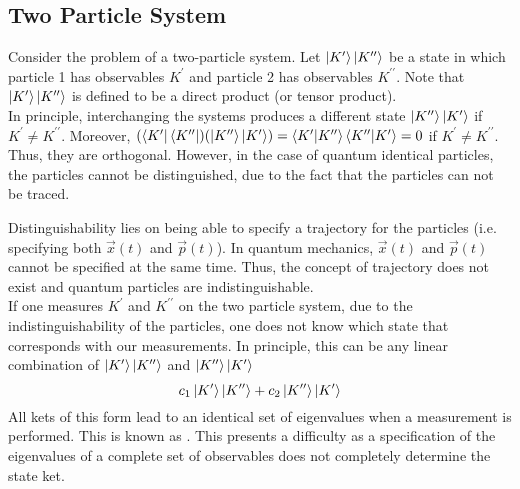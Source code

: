 \documentclass[12pt,a4paper,titlepage]{article}
\newcommand{\ul}[1]{\underline{\smash{#1}}} %
\begin{document}
\subsection{Two Particle System}
Consider the problem of a two-particle system. Let $\ket{K^{\prime}}\ket{K^{\prime\prime}}$ be a state in which particle 1 has observables $K^{\prime}$ and particle 2 has observables $K^{\prime\prime}$. Note that $\ket{K^{\prime}}\ket{K^{\prime\prime}}$ is defined to be a direct product (or tensor product).\\

In principle, interchanging the systems produces a different state $\ket{K^{\prime\prime}}\ket{K^{\prime}}$ if $K^{\prime}\neq K^{\prime\prime}$. Moreover, $(\bra{K^{\prime}}\bra{K^{\prime\prime}})(\ket{K^{\prime\prime}}\ket{K^{\prime}})=\ip{K^{\prime}}{K^{\prime\prime}}\ip{K^{\prime\prime}}{K^{\prime}}=0$ if $K^{\prime}\neq K^{\prime\prime}$. Thus, they are orthogonal. However, in the case of quantum identical particles, the particles cannot be distinguished, due to the fact that the particles can not be traced.

\begin{center}
\end{center}
Distinguishability lies on being able to specify a trajectory for the particles (i.e. specifying both $\vec{x}(t)$ and $\vec{p}(t)$). In quantum mechanics, $\vec{x}(t)$ and $\vec{p}(t)$ cannot be specified at the same time. Thus, the concept of trajectory does not exist and quantum particles are indistinguishable.\\

If one measures $K^{\prime}$ and $K^{\prime\prime}$ on the two particle system, due to the indistinguishability of the particles, one does not know which state that corresponds with our measurements. In principle, this can be any linear combination of $\ket{K^{\prime}}\ket{K^{\prime\prime}}$ and $\ket{K^{\prime\prime}}\ket{K^{\prime}}$
\[
c_{1}\ket{K^{\prime}}\ket{K^{\prime\prime}}+c_{2}\ket{K^{\prime\prime}}\ket{K^{\prime}}
\]
All kets of this form lead to an identical set of eigenvalues when a measurement is performed. This is known as \ul{exchange degeneracy}. This presents a difficulty as a specification of the eigenvalues of a complete set of observables does not completely determine the state ket.
\end{document}

